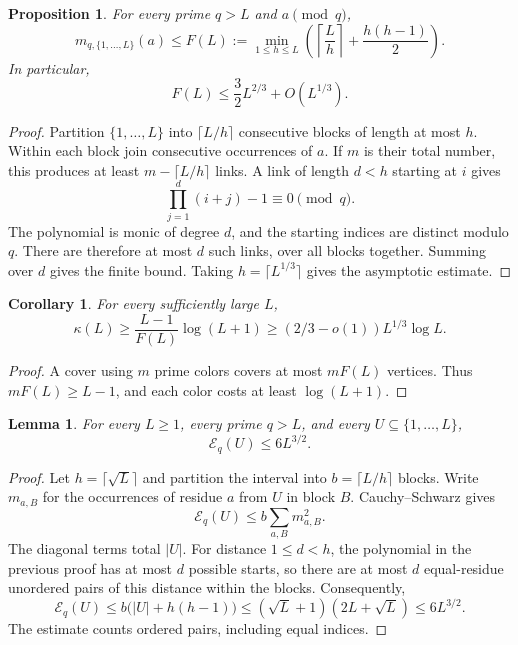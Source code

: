 \documentclass[11pt]{amsart}
\newtheorem{proposition}[theorem]{Proposition}
\newtheorem{lemma}[theorem]{Lemma}
\newtheorem{corollary}[theorem]{Corollary}
\theoremstyle{definition}
\theoremstyle{remark}
\begin{document}
\begin{proposition}\label{prop:fibresize}
For every prime $q>L$ and $a\pmod q$,
\[
m_{q,\{1,\ldots,L\}}(a)
\leq F(L):=\min_{1\leq h\leq L}
\left(\left\lceil\frac Lh\right\rceil+\frac{h(h-1)}2\right).
\]
In particular,
\[
F(L)\leq\frac32L^{2/3}+O(L^{1/3}).
\]
\end{proposition}
\begin{proof}
Partition $\{1,\ldots,L\}$ into $\lceil L/h\rceil$ consecutive blocks of
length at most $h$. Within each block join consecutive occurrences of
$a$. If $m$ is their total number, this produces at least
$m-\lceil L/h\rceil$ links. A link of length $d<h$ starting at $i$ gives
\[
\prod_{j=1}^d(i+j)-1\equiv0\pmod q.
\]
The polynomial is monic of degree $d$, and the starting indices are
distinct modulo $q$. There are therefore at most $d$ such links, over
all blocks together. Summing over $d$ gives the finite bound.
Taking $h=\lceil L^{1/3}\rceil$ gives the asymptotic estimate.
\end{proof}

\begin{corollary}\label{cor:globallower}
For every sufficiently large $L$,
\[
\kappa(L)\geq\frac{L-1}{F(L)}\log(L+1)
\geq(2/3-o(1))L^{1/3}\log L.
\]
\end{corollary}
\begin{proof}
A cover using $m$ prime colors covers at most $mF(L)$ vertices.
Thus $mF(L)\geq L-1$, and each color costs at least $\log(L+1)$.
\end{proof}

\begin{lemma}\label{lem:energy}
For every $L\geq1$, every prime $q>L$, and every
$U\subseteq\{1,\ldots,L\}$,
\[
\mathcal E_q(U)\leq6L^{3/2}.
\]
\end{lemma}
\begin{proof}
Let $h=\lceil\sqrt L\rceil$ and partition the interval into
$b=\lceil L/h\rceil$ blocks. Write $m_{a,B}$ for the occurrences of
residue $a$ from $U$ in block $B$. Cauchy--Schwarz gives
\[
\mathcal E_q(U)\leq b\sum_{a,B}m_{a,B}^2.
\]
The diagonal terms total $|U|$. For distance $1\leq d<h$, the
polynomial in the previous proof has at most $d$ possible starts, so
there are at most $d$ equal-residue unordered pairs of this distance
within the blocks. Consequently,
\[
\mathcal E_q(U)\leq b\bigl(|U|+h(h-1)\bigr)
\leq(\sqrt L+1)(2L+\sqrt L)\leq6L^{3/2}.
\]
The estimate counts ordered pairs, including equal indices.
\end{proof}
\end{document}
